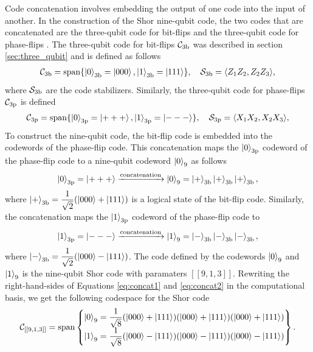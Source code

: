 \documentclass[]{arxiv}
\theoremstyle{plain}%
\theoremstyle{definition}
\theoremstyle{remark}
\begin{document}
Code concatenation involves embedding the output of one code into the input of another. In the construction of the Shor nine-qubit code, the two codes that are concatenated are the three-qubit code for bit-flips and the three-qubit code for phase-flips \cite{Terhal15}. The three-qubit code for bit-flips $\mathcal{C}_{\rm 3b}$ was described in section \ref{sec:three_qubit} and is defined as follows
%
\begin{equation}\begin{split}
\mathcal{C}_{\rm 3b}={\rm span}\{\ket{0}_{\rm 3b}=\ket{000}, \ket{1}_{\rm 3b}=\ket{111}\}, \quad \mathcal{S}_{\rm 3b}=\langle Z_1Z_2,Z_2Z_3 \rangle\rm,
\end{split}
\end{equation}
%
where $\mathcal{S}_{\rm 3b}$ are the code stabilizers. Similarly, the three-qubit code for phase-flips $\mathcal{C}_{\rm 3p}$ is defined 
%
\begin{equation}
\begin{split}
\mathcal{C}_{\rm 3p}={\rm span}\{\ket{0}_{\rm 3p}=\ket{+++}, \ket{1}_{\rm 3p}=\ket{---}\}, \quad \mathcal{S}_{\rm 3p}=\langle X_1X_2,X_2X_3\rangle\rm,
\end{split}
\end{equation}
%
To construct the nine-qubit code, the bit-flip code is embedded into the codewords of the phase-flip code. This concatenation maps the $\ket{0}_{\rm 3p}$ codeword of the phase-flip code to a nine-qubit codeword $\ket{0}_{9}$ as follows
%
\begin{equation} \label{eq:concat1}
\ket{0}_{\rm 3p}=\ket{+++}\xrightarrow{\rm concatenation} \ket{0}_9=\ket{+}_{\rm 3b}\ket{+}_{\rm 3b}\ket{+}_{\rm 3b}\rm,
\end{equation}
%
where $\ket{+}_{\rm 3b}=\dfrac{1}{\sqrt{2}}(\ket{000}+\ket{111})$ is a logical state of the bit-flip code. Similarly, the concatenation maps the $\ket{1}_{\rm 3p}$ codeword of the phase-flip code to
%
\begin{equation}\label{eq:concat2}
\ket{1}_{\rm 3p}=\ket{---}\xrightarrow{\rm concatenation} \ket{1}_9=\ket{-}_{\rm 3b}\ket{-}_{\rm 3b}\ket{-}_{\rm 3b}\rm,
\end{equation}
%
where $\ket{-}_{\rm 3b}=\dfrac{1}{\sqrt{2}}(\ket{000}-\ket{111})$. The code defined by the codewords $\ket{0}_9$ and $\ket{1}_9$ is the nine-qubit Shor code with paramaters $[[9,1,3]]$. Rewriting the right-hand-sides of Equations \ref{eq:concat1} and \ref{eq:concat2} in the computational basis, we get the following codespace for the Shor code  
%
\begin{equation}\mathcal{C}_{[[9,1,3]]}={\rm span}\left\{\begin{matrix}
\ket{0}_9=\dfrac{1}{\sqrt{8}}(\ket{000}+\ket{111})(\ket{000}+\ket{111})(\ket{000}+\ket{111})\\
\ket{1}_9=\dfrac{1}{\sqrt{8}}(\ket{000}-\ket{111})(\ket{000}-\ket{111})(\ket{000}-\ket{111})
\end{matrix}\right\}\rm.
\end{equation}
\end{document}
